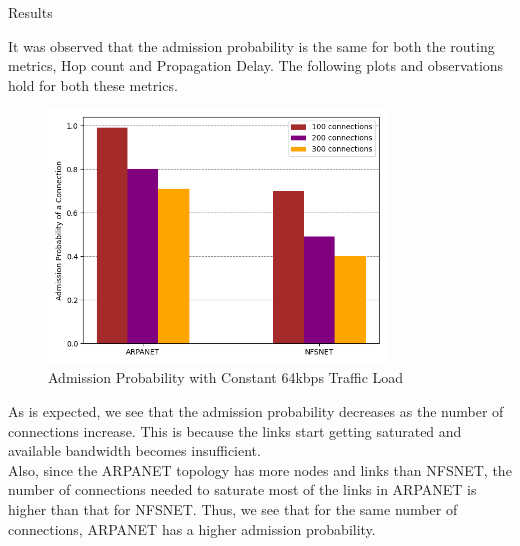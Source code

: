 \begin{section}{Results}

It was observed that the admission probability is the same for both the routing metrics, Hop count and Propagation Delay. The following plots and observations hold for both these metrics. \\

\begin{figure}[H]
    \centering
    \includegraphics[width=0.8\textwidth]{figures/fig1/fig1.png}
    \caption{Admission Probability with Constant 64kbps Traffic Load \protect\footnotemark}
    \label{fig:fig1}
\end{figure}

As is expected, we see that the admission probability decreases as the number of connections increase. This is because the links start getting saturated and available bandwidth becomes insufficient. \\
Also, since the ARPANET topology has more nodes and links than NFSNET, the number of connections needed to saturate most of the links in ARPANET is higher than that for NFSNET. Thus, we see that for the same number of connections, ARPANET has a higher admission probability. \\ 


\pagebreak


\end{section}
